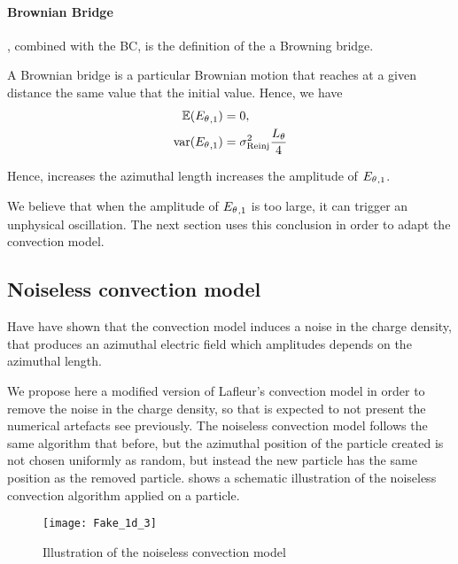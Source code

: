     \paragraph{Brownian Bridge\\}
      , combined with the \ac{BC}, is the definition of the a Browning bridge.
      
      A Brownian bridge is a particular Brownian motion that reaches at a given distance the same value that the initial value.
      Hence, we have \citep{ibe2013}
      \begin{align*}
        \mathbb{E}({E_{\theta}}_{, 1}) &= 0,  \\
        {\rm var}({E_{\theta}}_{, 1}) &= \sigma_{\rm Reinj}^2 \frac{L_{\theta}}{4}
      \end{align*}
    
      Hence, increases the azimuthal length increases the amplitude of ${E_{\theta}}_{, 1}$.
      
    
    We believe that when the amplitude of ${E_{\theta}}_{, 1}$ is too large, it can trigger an unphysical oscillation.
    The next section uses this conclusion in order to adapt the convection model.
    
    \subsection{Noiseless convection model}
      \label{sec-noiselessresults}
      Have have shown that the convection model induces a noise in the charge density, that produces an azimuthal electric field which amplitudes depends on the azimuthal length.
      
      We propose here a modified version of Lafleur's convection model in order to remove the noise in the charge density, so that is expected to not present the numerical artefacts see previously.
      The noiseless convection model follows the same algorithm that before, but the azimuthal position of the particle created is not chosen uniformly as random, but instead the new particle has the same position as the removed particle.
       shows a schematic illustration of the noiseless convection algorithm applied on a particle.
      
      \begin{figure}[hbtp]
        \centering
        \texttt{[image: Fake\_1d\_3]}
        \caption{Illustration of the noiseless convection model}
        \label{fig-fakez3}
      \end{figure}
      
